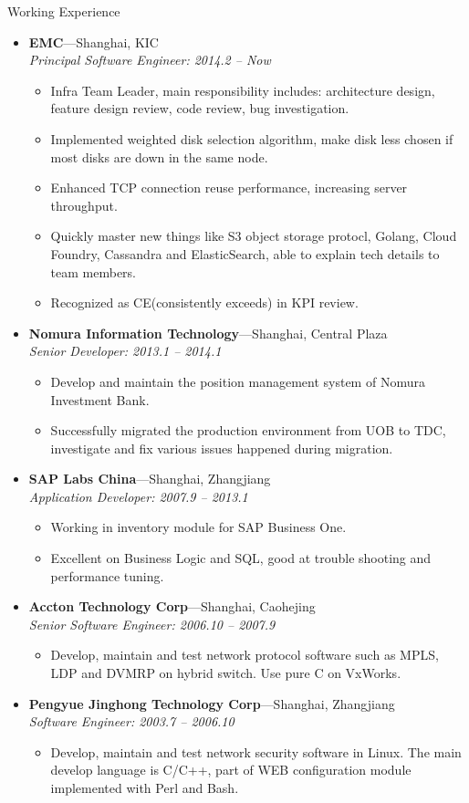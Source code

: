\documentclass[11pt,oneside]{article}
\newenvironment{ressection}[1]{
	\vspace{4pt}
	{\selectfont\Large#1}
	\begin{itemize}
	\vspace{3pt}
}{
	\end{itemize}
}
\newcommand{\ressubitem}[1]{
	\vspace{-1pt}
	\item \begin{flushleft} #1 \end{flushleft}
}
\newcommand{\resbigitem}[3]{
	\vspace{-5pt}
	\item
	\textbf{#1}---#2 \\
	\textit{#3}
}
\newenvironment{ressubsec}[3]{
	\resbigitem{#1}{#2}{#3}
	\vspace{-2pt}
	\begin{itemize}
}{
    \end{itemize}
}
\begin{document}
\begin{ressection}{Working Experience}

	\begin{ressubsec}{EMC}{Shanghai, KIC}{Principal Software Engineer: 2014.2 -- Now}
		\ressubitem{Infra Team Leader, main responsibility includes: architecture design, feature design review, code review, bug investigation.}
		\ressubitem{Implemented weighted disk selection algorithm, make disk less chosen if most disks are down in the same node.}
		\ressubitem{Enhanced TCP connection reuse performance, increasing server throughput.}
		\ressubitem{Quickly master new things like S3 object storage protocl, Golang, Cloud Foundry, Cassandra and ElasticSearch, able to explain tech details to team members.}
		\ressubitem{Recognized as CE(consistently exceeds) in KPI review.}
	\end{ressubsec}

	\begin{ressubsec}{Nomura Information Technology}{Shanghai, Central Plaza}{Senior Developer: 2013.1 -- 2014.1}
		\ressubitem{Develop and maintain the position management system of Nomura Investment Bank.}
		\ressubitem{Successfully migrated the production environment from UOB to TDC, investigate and
					fix various issues happened during migration.}
	\end{ressubsec}

	\begin{ressubsec}{SAP Labs China}{Shanghai, Zhangjiang}{Application Developer: 2007.9 -- 2013.1}
		\ressubitem{Working in inventory module for SAP Business One.}
		\ressubitem{Excellent on Business Logic and SQL, good at trouble shooting and performance tuning.}
	\end{ressubsec}

	\begin{ressubsec}{Accton Technology Corp}{Shanghai, Caohejing}{Senior Software Engineer: 2006.10 -- 2007.9}
		\ressubitem{Develop, maintain and test network protocol software such as MPLS, LDP and DVMRP on
					hybrid switch. Use pure C on VxWorks.}
	\end{ressubsec}

	\begin{ressubsec}{Pengyue Jinghong Technology Corp}{Shanghai, Zhangjiang}{Software Engineer: 2003.7 -- 2006.10}
		\ressubitem{Develop, maintain and test network security software in Linux. The main develop
					language is C/C++, part of WEB configuration module implemented with Perl and
					Bash.}
	\end{ressubsec}

\end{ressection}
\end{document}
